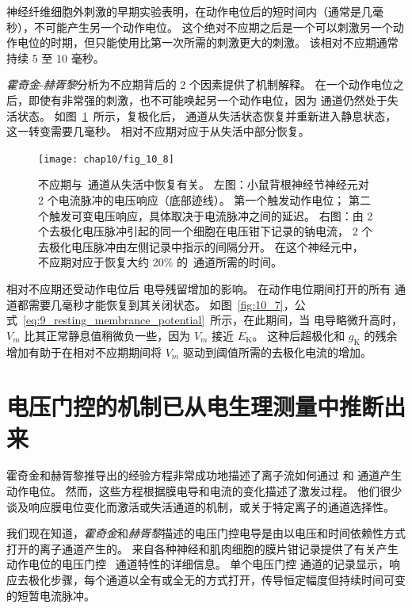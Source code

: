 神经纤维细胞外刺激的早期实验表明，在动作电位后的短时间内（通常是几毫秒），不可能产生另一个动作电位。 
这个绝对不应期之后是一个可以刺激另一个动作电位的时期，但只能使用比第一次所需的刺激更大的刺激。 
该相对不应期通常持续 5 至 10 毫秒。


\textit{霍奇金}-\textit{赫胥黎}分析为不应期背后的 2 个因素提供了机制解释。
在一个动作电位之后，即使有非常强的刺激，也不可能唤起另一个动作电位，因为  通道仍然处于失活状态。
如图~\ref{fig:10_8}~所示，复极化后， 通道从失活状态恢复并重新进入静息状态，这一转变需要几毫秒。
相对不应期对应于从失活中部分恢复。


\begin{figure}[htbp]
	\centering
	\texttt{[image: chap10/fig\_10\_8]}
	\caption{不应期与~通道从失活中恢复有关。
		左图：小鼠背根神经节神经元对 2 个电流脉冲的电压响应（底部迹线）。
		第一个触发动作电位；
		第二个触发可变电压响应，具体取决于电流脉冲之间的延迟。
		右图：由 2 个去极化电压脉冲引起的同一个细胞在电压钳下记录的钠电流， 2 个去极化电压脉冲由左侧记录中指示的间隔分开。
		在这个神经元中，不应期对应于恢复大约 20\% 的~通道所需的时间。}
	\label{fig:10_8}
\end{figure}


相对不应期还受动作电位后  电导残留增加的影响。
在动作电位期间打开的所有  通道都需要几毫秒才能恢复到其关闭状态。
如图~\ref{fig:10_7}，公式~\ref{eq:9_resting_membrance_potential}~所示，在此期间，当  电导略微升高时，$V_m$ 比其正常静息值稍微负一些，因为 $V_m$ 接近 $E_\text{K}$。
这种后超极化和 $g_\text{K}$ 的残余增加有助于在相对不应期期间将 $V_m$ 驱动到阈值所需的去极化电流的增加。




\section{电压门控的机制已从电生理测量中推断出来}

霍奇金和赫胥黎推导出的经验方程非常成功地描述了离子流如何通过  和  通道产生动作电位。
然而，这些方程根据膜电导和电流的变化描述了激发过程。
他们很少谈及响应膜电位变化而激活或失活通道的机制，或关于特定离子的通道选择性。


我们现在知道，\textit{霍奇金}和\textit{赫胥黎}描述的电压门控电导是由以电压和时间依赖性方式打开的离子通道产生的。
来自各种神经和肌肉细胞的膜片钳记录提供了有关产生动作电位的电压门控~ 通道特性的详细信息。
单个电压门控  通道的记录显示，响应去极化步骤，每个通道以全有或全无的方式打开，传导恒定幅度但持续时间可变的短暂电流脉冲。



